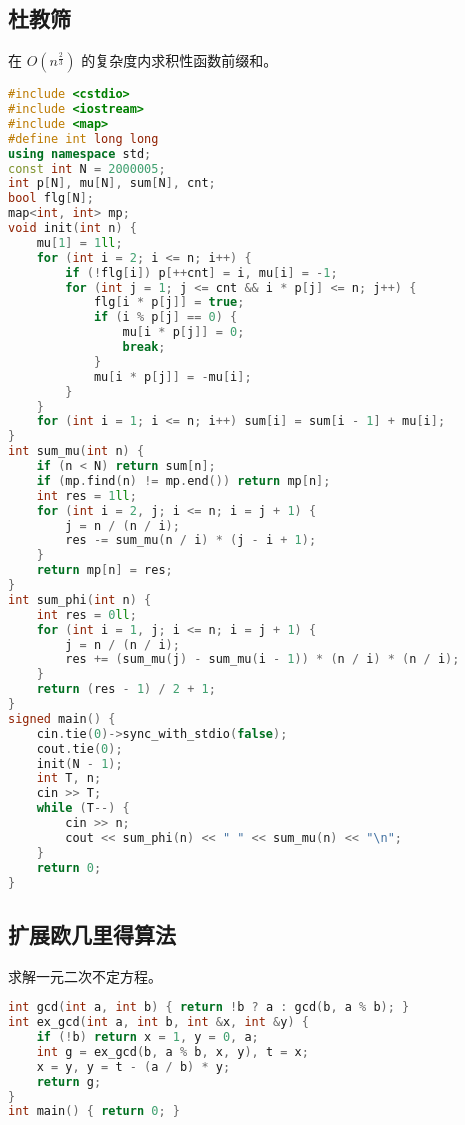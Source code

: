 \documentclass[9pt, a4paper, oneside]{book}
\begin{document}
\subsection{杜教筛}
在 $O(n^{\frac{2}{3}})$ 的复杂度内求积性函数前缀和。
\begin{lstlisting}[language={C++}]
#include <cstdio>
#include <iostream>
#include <map>
#define int long long
using namespace std;
const int N = 2000005;
int p[N], mu[N], sum[N], cnt;
bool flg[N];
map<int, int> mp;
void init(int n) {
    mu[1] = 1ll;
    for (int i = 2; i <= n; i++) {
        if (!flg[i]) p[++cnt] = i, mu[i] = -1;
        for (int j = 1; j <= cnt && i * p[j] <= n; j++) {
            flg[i * p[j]] = true;
            if (i % p[j] == 0) {
                mu[i * p[j]] = 0;
                break;
            }
            mu[i * p[j]] = -mu[i];
        }
    }
    for (int i = 1; i <= n; i++) sum[i] = sum[i - 1] + mu[i];
}
int sum_mu(int n) {
    if (n < N) return sum[n];
    if (mp.find(n) != mp.end()) return mp[n];
    int res = 1ll;
    for (int i = 2, j; i <= n; i = j + 1) {
        j = n / (n / i);
        res -= sum_mu(n / i) * (j - i + 1);
    }
    return mp[n] = res;
}
int sum_phi(int n) {
    int res = 0ll;
    for (int i = 1, j; i <= n; i = j + 1) {
        j = n / (n / i);
        res += (sum_mu(j) - sum_mu(i - 1)) * (n / i) * (n / i);
    }
    return (res - 1) / 2 + 1;
}
signed main() {
    cin.tie(0)->sync_with_stdio(false);
    cout.tie(0);
    init(N - 1);
    int T, n;
    cin >> T;
    while (T--) {
        cin >> n;
        cout << sum_phi(n) << " " << sum_mu(n) << "\n";
    }
    return 0;
}\end{lstlisting}
\subsection{扩展欧几里得算法}
求解一元二次不定方程。
\begin{lstlisting}[language={C++}]
int gcd(int a, int b) { return !b ? a : gcd(b, a % b); }
int ex_gcd(int a, int b, int &x, int &y) {
    if (!b) return x = 1, y = 0, a;
    int g = ex_gcd(b, a % b, x, y), t = x;
    x = y, y = t - (a / b) * y;
    return g;
}
int main() { return 0; }\end{lstlisting}
\end{document}
